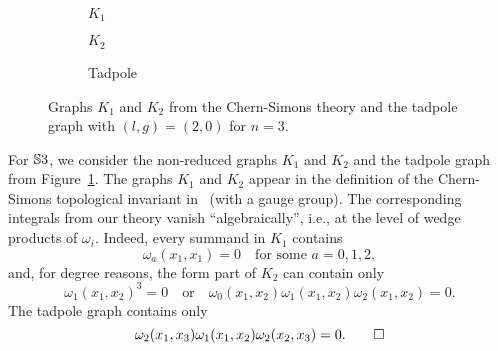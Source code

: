 \documentclass[\MainFolder/Text.tex]{subfiles}
\begin{document}
\begin{Remark}
\end{Remark}

\begin{Remark}\label{Rem:GraphsThreeSphere}
{ \begingroup
\begin{figure}
\centering
\begin{subfigure}{0.45\textwidth}
\centering

\caption{$K_1$}
\end{subfigure}
\begin{subfigure}{0.45\textwidth}
\centering

\caption{$K_2$}
\end{subfigure}
\begin{subfigure}{0.45\textwidth}
\centering

\caption{Tadpole}
\end{subfigure}
\caption[Graphs $K_1$, $K_2$ and the tadpole graph from Chern-Simons theory.]{Graphs $K_1$ and $K_2$ from the Chern-Simons theory and the tadpole graph with $(l,g)=(2,0)$ for $n=3$.}\label{Fig:K1K2}
\end{figure}
\endgroup }

For $\mathbb{S}{3}$, we consider the non-reduced graphs $K_1$ and $K_2$ and the tadpole graph from Figure~\ref{Fig:K1K2}. The graphs $K_1$ and $K_2$ appear in the definition of the Chern-Simons topological invariant in~\cite{Kohno2002} (with a gauge group). The corresponding integrals from our theory vanish ``algebraically'', i.e., at the level of wedge products of $\omega_i$. Indeed, every summand in $K_1$ contains 
$$ \omega_a(x_1,x_1) = 0\quad \text{for some }a=0, 1, 2, $$
and, for degree reasons, the form part of $K_2$ can contain   only
$$ \omega_1(x_1,x_2)^3=0\quad\text{or}\quad\omega_0(x_1,x_2)\omega_{1}(x_1,x_2)\omega_{2}(x_1,x_2)=0.$$ 
The tadpole graph contains only
\begin{equation*}
 \omega_2(x_1,x_3)\omega_1(x_1,x_2)\omega_2(x_2,x_3) = 0.\qedhere \end{equation*}
\qedhere
\end{Remark}
\end{document}
